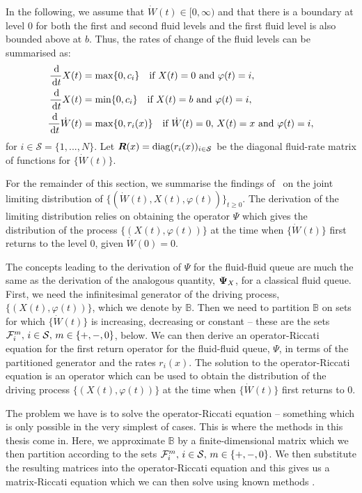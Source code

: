 In the following, we assume that $\dot W(t) \in [0,\infty)$ and that there is a boundary at level $0$ for both the first and second fluid levels and the first fluid level is also bounded above at \(b\). Thus, the rates of change of the fluid levels can be summarised as:
% 
	\begin{align*} 
		\frac{\, \mathrm{d}}{\, \mathrm{d} t}  X(t) & = \max\{0, c_i\} \quad \mbox{if }  X(t) = 0 \mbox{ and } \varphi(t) = i, \\
		\frac{\, \mathrm{d}}{\, \mathrm{d} t}  X(t) & = \min\{0, c_i\} \quad \mbox{if }  X(t) = b \mbox{ and } \varphi(t) = i, \\
          	\frac{\, \mathrm{d}}{\, \mathrm{d} t} \dot W(t) & = \max\{0, r_i(x)\} \quad \mbox{if } \dot W(t) = 0,\, X(t) = x \mbox{ and } \varphi(t) = i, 	
	\end{align*} 
for $i \in \mathcal{S} = \{1,...,N\}$. Let $\boldsymbol R(x) =\mathrm{diag}(r_i(x))_{i \in \mathcal{S}}$ be the diagonal fluid-rate matrix of functions for $\{\dot W(t)\}$. 

For the remainder of this section, we summarise the findings of~\cite{bo2014} on the joint limiting distribution of $\{( \dot W(t), X(t), \varphi(t))\}_{t \geq 0}$. The derivation of the limiting distribution relies on obtaining the operator \(\mathbb \Psi\) which gives the distribution of the process \(\{(X(t),\varphi(t))\}\) at the time when \(\{\dot W(t)\}\) first returns to the level 0, given \(\dot W(0)=0\).

The concepts leading to the derivation of \( {\mathbb \Psi}\) for the fluid-fluid queue are much the same as the derivation of the analogous quantity, \(\boldsymbol\Psi_X\), for a classical fluid queue. First, we need the infinitesimal generator of the driving process, \(\{(X(t),\varphi(t))\}\), which we denote by \(\mathbb B\). Then we need to partition \(\mathbb B\) on sets for which \(\{\dot W(t)\}\) is increasing, decreasing or constant -- these are the sets \(\mathcal F_i^m,\, i\in\mathcal{S},\,m\in\{+,-,0\}\), below. We can then derive an operator-Riccati equation for the first return operator for the fluid-fluid queue, \(\mathbb \Psi\), in terms of the partitioned generator and the rates \(r_i(x)\). The solution to the operator-Riccati equation is an operator which can be used to obtain the distribution of the driving process \(\{(X(t),\varphi(t))\}\) at the time when \(\{\dot W(t)\}\) first returns to \(0\). 

The problem we have is to solve the operator-Riccati equation -- something which is only possible in the very simplest of cases. This is where the methods in this thesis come in. Here, we approximate \(\mathbb B\) by a finite-dimensional matrix which we then partition according to the sets \(\mathcal F_i^m,\, i\in\mathcal{S},\,m\in\{+,-,0\}\). We then substitute the resulting matrices into the operator-Riccati equation and this gives us a matrix-Riccati equation which we can then solve using known methods \citep{bot08}. 

